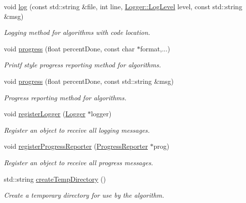 \begin{DoxyCompactItemize}
void \hyperlink{classBUSBOY_1_1AlgorithmContext_a5b7af6c6d4210beb4dc960e3f73b702b}{log} (const std::string \&file, int line, \hyperlink{classBUSBOY_1_1Logger_ac674cbb789eaa29c338c66248a4e4234}{Logger::LogLevel} level, const std::string \&msg)
\begin{DoxyCompactList}\small\item\em Logging method for algorithms with code location. \item\end{DoxyCompactList}\item 
void \hyperlink{classBUSBOY_1_1AlgorithmContext_aa5bcd4c4eef6881a044ac49a949893ee}{progress} (float percentDone, const char $\ast$format,...)
\begin{DoxyCompactList}\small\item\em Printf style progress reporting method for algorithms. \item\end{DoxyCompactList}\item 
void \hyperlink{classBUSBOY_1_1AlgorithmContext_af7cd5e155ce3598f21e9130f36ae258a}{progress} (float percentDone, const std::string \&msg)
\begin{DoxyCompactList}\small\item\em Progress reporting method for algorithms. \item\end{DoxyCompactList}\item 
void \hyperlink{classBUSBOY_1_1AlgorithmContext_a4ea5204f7bfb563ae6e1a90a152a15e8}{registerLogger} (\hyperlink{classBUSBOY_1_1Logger}{Logger} $\ast$logger)
\begin{DoxyCompactList}\small\item\em Register an object to receive all logging messages. \item\end{DoxyCompactList}\item 
void \hyperlink{classBUSBOY_1_1AlgorithmContext_ada0123d7af4b630548725cbff1ad606a}{registerProgressReporter} (\hyperlink{classBUSBOY_1_1ProgressReporter}{ProgressReporter} $\ast$prog)
\begin{DoxyCompactList}\small\item\em Register an object to receive all progress messages. \item\end{DoxyCompactList}\item 
std::string \hyperlink{classBUSBOY_1_1AlgorithmContext_ae745dab8a603182ecb4864582eba72a2}{createTempDirectory} ()
\begin{DoxyCompactList}\small\item\em Create a temporary directory for use by the algorithm. \item\end{DoxyCompactList}\item 

\end{DoxyCompactItemize}
